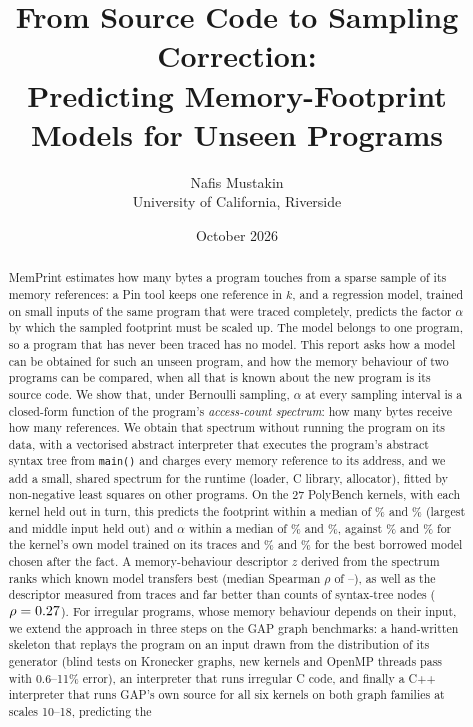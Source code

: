 \documentclass[11pt]{article}
\title{From Source Code to Sampling Correction:\\Predicting Memory-Footprint Models for Unseen Programs}
\author{Nafis Mustakin\\University of California, Riverside}
\date{October 2026}
\newcommand{\memprint}{MemPrint}
\newcommand{\term}[1]{\emph{#1}}
\newcommand{\code}[1]{\texttt{#1}}
\begin{document}
\maketitle

\begin{abstract}
\memprint{} estimates how many bytes a program touches from a sparse sample of its memory references: a Pin
tool keeps one reference in $k$, and a regression model, trained on small inputs of the same program that were
traced completely, predicts the factor $\alpha$ by which the sampled footprint must be scaled up. The model
belongs to one program, so a program that has never been traced has no model. This report asks how a model can be
obtained for such an unseen program, and how the memory behaviour of two programs can be compared, when all that is
known about the new program is its source code. We show that, under Bernoulli sampling, $\alpha$ at every
sampling interval is a closed-form function of the program's \term{access-count spectrum}: how many bytes
receive how many references. We obtain that spectrum without running the program on its data, with a vectorised
abstract interpreter that executes the program's abstract syntax tree from \code{main()} and charges every memory
reference to its address, and we add a small, shared spectrum for the runtime (loader, C library, allocator),
fitted by non-negative least squares on other programs. On the 27 PolyBench kernels, with each kernel held out in
turn, this predicts the footprint within a median of \numfpExtra\% and \numfpInter\% (largest and middle input
held out) and $\alpha$ within a median of \numalphaExtra\% and \numalphaInter\%, against
\numownExtra\% and \numownInter\% for the kernel's own model trained on its traces and
\numoracleExtra\% and \numoracleInter\% for the best borrowed model chosen after the fact. A memory-behaviour
descriptor $z$ derived from the spectrum ranks which known model transfers best (median Spearman $\rho$ of
\numrhoStaticExtra{}--\numrhoStaticInter), as well as the descriptor measured from traces and far better than
counts of syntax-tree nodes ($\rho=0.27$). For irregular programs, whose memory behaviour depends on
their input, we extend the approach in three steps on the GAP graph benchmarks: a hand-written skeleton that replays
the program on an input drawn from the distribution of its generator (blind tests on Kronecker graphs, new kernels
and OpenMP threads pass with 0.6--11\% error), an interpreter that runs irregular C code, and finally a C++
interpreter that runs GAP's own source for all six kernels on both graph families at scales 10--18, predicting the

\end{abstract}
\end{document}
